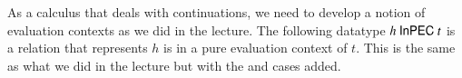 \documentclass[a4paper,11pt]{article}
\newcommand\data[1]{{\AgdaFunction{#1}}}
\newcommand\con[1]{{\AgdaInductiveConstructor{#1}}}
\begin{document}
As a calculus that deals with continuations, we need to develop a notion of evaluation contexts as we did in the lecture.
The following datatype $h\ \data{InPEC}\ t$ is a relation that represents $h$ is in a pure evaluation context of $t$.
This is the same as what we did in the lecture but with the \con{case} and \con{suc} cases added.
\begin{code}%
%
\>[2]\AgdaSpace{}%
\AgdaSpace{}%
\AgdaSymbol{(}\AgdaSpace{}%
\AgdaSymbol{:}\AgdaSpace{}%
\AgdaSpace{}%
\AgdaSpace{}%
\AgdaSpace{}%
\AgdaSymbol{)}\AgdaSpace{}%
\AgdaSymbol{:}\AgdaSpace{}%
\AgdaSpace{}%
\AgdaSpace{}%
\AgdaSpace{}%
\AgdaSpace{}%
\AgdaSpace{}%
\AgdaSpace{}%
\<%
\\
\>[2][@{}l@{\AgdaIndent{0}}]%
\>[4]\AgdaSpace{}%
\AgdaSymbol{:}\AgdaSpace{}%
\AgdaSpace{}%
\AgdaSpace{}%
\<%
\\
%
\>[4]\AgdaSpace{}%
\AgdaSymbol{:}\AgdaSpace{}%
\AgdaSpace{}%
\AgdaSymbol{\{}\AgdaSpace{}%
\AgdaSymbol{:}\AgdaSpace{}%
\AgdaSpace{}%
\AgdaSpace{}%
\AgdaSpace{}%
\AgdaSymbol{(}\AgdaSpace{}%
\AgdaSpace{}%
\AgdaSpace{}%
\AgdaOperator{\AgdaInductiveConstructor{!}}\AgdaSpace{}%
\AgdaSymbol{)\}}\AgdaSpace{}%
\AgdaSymbol{(}\AgdaSpace{}%
\AgdaSymbol{:}\AgdaSpace{}%
\AgdaSpace{}%
\AgdaSpace{}%
\AgdaSymbol{)}\AgdaSpace{}%
\AgdaSpace{}%
\AgdaSpace{}%
\AgdaSpace{}%
\AgdaSpace{}%
\AgdaSymbol{(}\AgdaSpace{}%
\AgdaSpace{}%
\AgdaSymbol{)}\<%
\\
%
\>[4]\AgdaSpace{}%
\AgdaSymbol{:}\AgdaSpace{}%
\AgdaSpace{}%
\AgdaSymbol{\{}\AgdaSpace{}%
\AgdaSymbol{:}\AgdaSpace{}%
\AgdaSpace{}%
\AgdaSpace{}%
\AgdaSpace{}%

\end{code}
\end{document}
